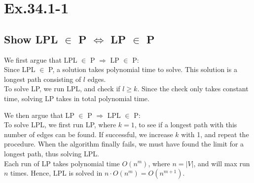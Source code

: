 \section*{Ex.34.1-1}
\subsection*{Show LPL $\in$ P $\Leftrightarrow$ LP $\in$ P}

We first argue that LPL $\in$ P $\Rightarrow$ LP $\in$ P:
\\
Since LPL $\in$ P, a solution takes polynomial time to solve. This solution is a longest path consisting of $l$ edges.
\\
To solve LP, we run LPL, and check if $l\geq k$. Since the check only takes constant time, solving LP takes in total polynomial time.

We then argue that LP $\in$ P $\Rightarrow$ LPL $\in$ P:
\\
To solve LPL, we first run LP, where $k=1$, to see if a longest path with this number of edges can be found. If successful, we increase $k$ with 1, and repeat the procedure. When the algorithm finally fails, we must have found the limit for a longest path, thus solving LPL.
\\
Each run of LP takes polynomial time $O(n^m)$, where $n=|V|$, and will max run $n$ times. Hence, LPL is solved in $n \cdot O(n^m)=O(n^{m+1})$.